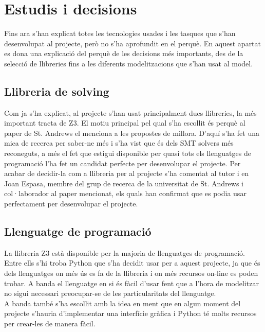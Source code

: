 


\chapter{Estudis i decisions} %

\label{Estudis i decisions} %

Fins ara s'han explicat totes les tecnologies usades i les tasques que s'han desenvolupat al projecte, però no s'ha aprofundit en el perquè. En aquest apartat es dona una explicació del perquè de les decisions més importants, des de la selecció de llibreries fins a les diferents modelitzacions que s'han usat al model.

\section{Llibreria de solving}
Com ja s'ha explicat, al projecte s'han usat principalment dues llibreries, la més important tracta de Z3. El motiu principal pel qual s'ha escollit és perquè al paper de St. Andrews el menciona a les propostes de millora. D'aquí s'ha fet una mica de recerca per saber-ne més i s'ha vist que és dels SMT solvers més reconeguts, a més el fet que estigui disponible per quasi tots els llenguatges de programació l'ha fet un candidat perfecte per desenvolupar el projecte. Per acabar de decidir-la com a llibreria per al projecte s'ha comentat al tutor i en Joan Espasa, membre del grup de recerca de la universitat de St. Andrews i col·laborador al paper mencionat, els quals han confirmat que es podia usar perfectament per desenvolupar el projecte.\\

\section{Llenguatge de programació}
La llibreria Z3 \cite{Z3Prover} està disponible per la majoria de llenguatges de programació. Entre ells s'hi troba Python que s'ha decidit usar per a aquest projecte, ja que és dels llenguatges on més ús es fa de la llibreria i on més recursos on-line es poden trobar. A banda el llenguatge en si és fàcil d'usar fent que a l'hora de modelitzar no sigui necessari preocupar-se de les particularitats del llenguatge.\\
A banda també s'ha escollit amb la idea en ment que en algun moment del projecte s'hauria d'implementar una interfície gràfica i Python té molts recursos per crear-les de manera fàcil.

